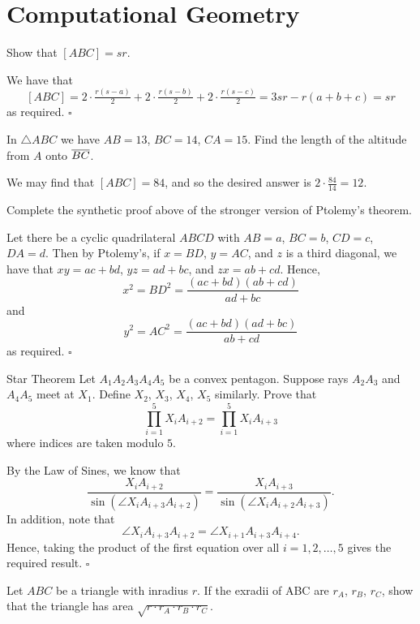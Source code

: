 \documentclass{article}
\begin{document}
\section{Computational Geometry}

\begin{problem}[5.5]{}
Show that $[ABC] = sr$.
\end{problem}

We have that \[[ABC] = 2\cdot\tfrac{r(s-a)}{2}+2\cdot\tfrac{r(s-b)}{2}+2\cdot\tfrac{r(s-c)}{2} = 3sr-r(a+b+c)=sr\] as required. $\square$

\begin{problem}[5.6]{}
In $\triangle ABC$ we have $AB = 13$, $BC = 14$, $CA = 15$. Find the length of the altitude from $A$ onto $\overline{BC}$.
\end{problem}

We may find that $[ABC] = 84$, and so the desired answer is $2\cdot \tfrac{84}{14} = \boxed{12}$.

\begin{problem}[5.12]{}
Complete the synthetic proof above of the stronger version of Ptolemy’s theorem.
\end{problem}

Let there be a cyclic quadrilateral $ABCD$ with $AB = a$, $BC = b$, $CD = c$, $DA = d$. Then by Ptolemy's, if $x = BD$, $y = AC$, and $z$ is a third diagonal, we have that $xy = ac + bd$, $yz = ad + bc$, and $zx = ab + cd$. Hence, \[x^2 = BD^2 = \dfrac{(ac+bd)(ab+cd)}{ad+bc}\] and \[y^2 = AC^2 = \dfrac{(ac+bd)(ad+bc)}{ab+cd}\] as required. $\square$

\begin{problem}[5.16]{Star Theorem}
Let $A_1A_2A_3A_4A_5$ be a convex pentagon. Suppose rays $A_2A_3$ and $A_4A_5$ meet at $X_1$. Define $X_2$, $X_3$, $X_4$, $X_5$ similarly. Prove that \[\prod_{i=1}^5 X_iA_{i+2} = \prod_{i=1}^5 X_iA_{i+3}\] where indices are taken modulo $5$.
\end{problem}

By the Law of Sines, we know that \[\dfrac{X_iA_{i+2}}{\sin(\angle X_iA_{i+3}A_{i+2})} = \dfrac{X_iA_{i+3}}{\sin(\angle X_iA_{i+2}A_{i+3})}.\] In addition, note that \[\angle X_iA_{i+3}A_{i+2} = \angle X_{i+1}A_{i+3}A_{i+4}.\] Hence, taking the product of the first equation over all $i = 1, 2, \dots, 5$ gives the required result. $\square$

\begin{problem}[5.17]{}
Let $ABC$ be a triangle with inradius $r$. If the exradii of ABC are $r_A$, $r_B$, $r_C$, show that the triangle has area $\sqrt{r \cdot r_A \cdot r_B \cdot r_C}$.
\end{problem}
\end{document}
